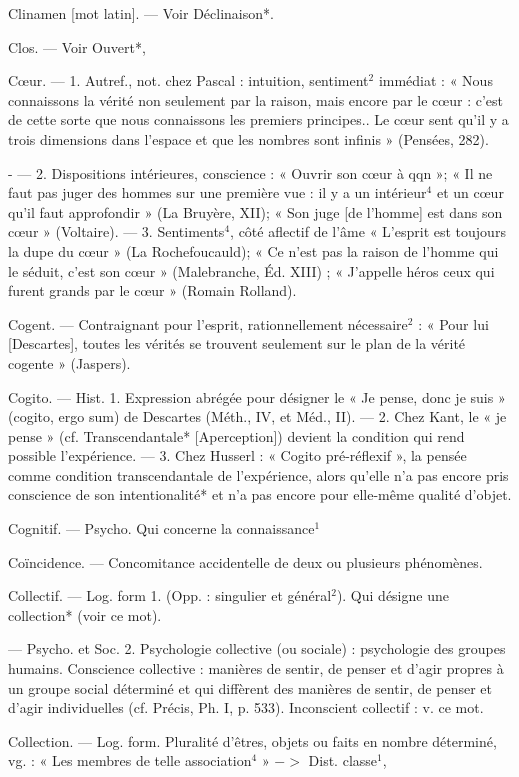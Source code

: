 Clinamen [mot latin]. — Voir Déclinaison*.

Clos. — Voir Ouvert*,

Cœur. — 1. Autref., not. chez Pascal :
intuition, sentiment$^2$ immédiat :
« Nous connaissons la vérité non
seulement par la raison, mais encore
par le cœur : c’est de cette sorte que
nous connaissons les premiers principes.. Le cœur sent qu’il y a trois
dimensions dans l’espace et que les
nombres sont infinis » (Pensées, 282).

- — 2. Dispositions intérieures, conscience : « Ouvrir son cœur à qqn »;
« Il ne faut pas juger des hommes
sur une première vue : il y a un
intérieur$^4$ et un cœur qu'il faut
approfondir » (La Bruyère, XII);
« Son juge [de l'homme] est dans
son cœur » (Voltaire). — 3. Sentiments$^4$, côté aflectif de l'âme
« L'esprit est toujours la dupe du
cœur » (La Rochefoucauld); « Ce
n'est pas la raison de l’homme qui
le séduit, c’est son cœur » (Malebranche, Éd. XIII) ; « J’appelle héros
ceux qui furent grands par le cœur »
(Romain Rolland).

Cogent. — Contraignant pour l'esprit,
rationnellement nécessaire$^2$ : « Pour
lui [Descartes], toutes les vérités se
trouvent seulement sur le plan de la
vérité cogente » (Jaspers).
%

Cogito. — Hist. 1. Expression abrégée
pour désigner le « Je pense, donc je
suis » (cogito, ergo sum) de Descartes
(Méth., IV, et Méd., II). — 2. Chez
Kant, le « je pense » (cf. Transcendantale* [Aperception]) devient la
condition qui rend possible l’expérience. — 3. Chez Husserl : « Cogito
pré-réflexif », la pensée comme condition transcendantale de l’expérience, alors qu’elle n'a pas encore
pris conscience de son intentionalité*
et n’a pas encore pour elle-même
qualité d'objet.

Cognitif. — Psycho. Qui concerne la
connaissance$^1$

Coïncidence. — Concomitance accidentelle de deux ou plusieurs phénomènes.

Collectif. — Log. form 1. (Opp. : singulier et général$^2$). Qui désigne une
collection* (voir ce mot).

— Psycho. et Soc. 2. Psychologie
collective (ou sociale) : psychologie
des groupes humains. Conscience
collective : manières de sentir, de
penser et d’agir propres à un groupe
social déterminé et qui diffèrent des
manières de sentir, de penser et
d'agir individuelles (cf. Précis, Ph. I,
p. 533). Inconscient collectif : v. ce
mot.

Collection. — Log. form. Pluralité
d'êtres, objets ou faits en nombre
déterminé, vg. : « Les membres de
telle association$^4$ » $->$ Dist. classe$^1$,

